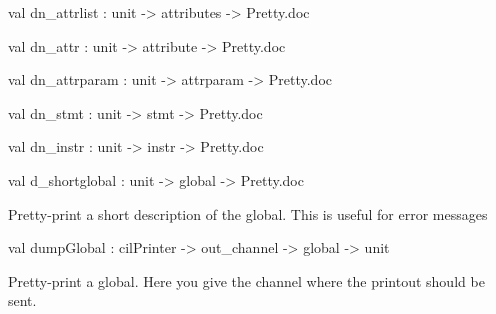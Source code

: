 \documentclass[11pt]{article}
\begin{document}
\label{val:Cil.dn-underscoreattrlist}\begin{ocamldoccode}
val dn_attrlist : unit -> attributes -> Pretty.doc
\end{ocamldoccode}




\label{val:Cil.dn-underscoreattr}\begin{ocamldoccode}
val dn_attr : unit -> attribute -> Pretty.doc
\end{ocamldoccode}




\label{val:Cil.dn-underscoreattrparam}\begin{ocamldoccode}
val dn_attrparam : unit -> attrparam -> Pretty.doc
\end{ocamldoccode}




\label{val:Cil.dn-underscorestmt}\begin{ocamldoccode}
val dn_stmt : unit -> stmt -> Pretty.doc
\end{ocamldoccode}




\label{val:Cil.dn-underscoreinstr}\begin{ocamldoccode}
val dn_instr : unit -> instr -> Pretty.doc
\end{ocamldoccode}




\label{val:Cil.d-underscoreshortglobal}\begin{ocamldoccode}
val d_shortglobal : unit -> global -> Pretty.doc
\end{ocamldoccode}
\begin{ocamldocdescription}
Pretty-print a short description of the global. This is useful for error 
 messages


\end{ocamldocdescription}




\label{val:Cil.dumpGlobal}\begin{ocamldoccode}
val dumpGlobal : cilPrinter -> out_channel -> global -> unit
\end{ocamldoccode}
\begin{ocamldocdescription}
Pretty-print a global. Here you give the channel where the printout
 should be sent.


\end{ocamldocdescription}
\end{document}
